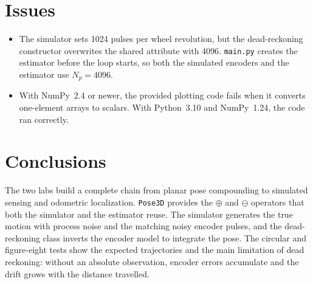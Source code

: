 \documentclass[letterpaper,12pt]{article}
\begin{document}
\section{Issues}
\label{sec:issues}

\begin{itemize}
    \item The simulator sets 1024 pulses per wheel revolution, but the
    dead-reckoning constructor overwrites the shared attribute with 4096.
    \texttt{main.py} creates the estimator before the loop starts, so both
    the simulated encoders and the estimator use $N_p=4096$.
    \item With NumPy~2.4 or newer, the provided plotting code fails when it
    converts one-element arrays to scalars. With Python~3.10 and NumPy~1.24, the code ran correctly.
\end{itemize}

\section{Conclusions}
\label{sec:conclusions}

The two labs build a complete chain from planar pose compounding to simulated
sensing and odometric localization. \texttt{Pose3D} provides the $\oplus$ and
$\ominus$ operators that both the simulator and the estimator reuse. The
simulator generates the true motion with process noise and the matching noisy
encoder pulses, and the dead-reckoning class inverts the encoder model to
integrate the pose. The circular and figure-eight tests show the expected
trajectories and the main limitation of dead reckoning: without an absolute
observation, encoder errors accumulate and the drift grows with the distance
travelled.
\end{document}
